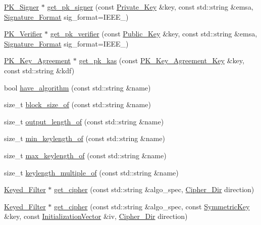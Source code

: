 \begin{DoxyCompactItemize}
\hyperlink{classBotan_1_1PK__Signer}{P\-K\-\_\-\-Signer} $\ast$ \hyperlink{namespaceBotan_adccb197b7d2ba3c31a1a99a83e7e2721}{get\-\_\-pk\-\_\-signer} (const \hyperlink{classBotan_1_1Private__Key}{Private\-\_\-\-Key} \&key, const std\-::string \&emsa, \hyperlink{namespaceBotan_ad8a9578625edf847cbcba3ae15648cda}{Signature\-\_\-\-Format} sig\-\_\-format=I\-E\-E\-E\-\_)
\item 
\hyperlink{classBotan_1_1PK__Verifier}{P\-K\-\_\-\-Verifier} $\ast$ \hyperlink{namespaceBotan_aede89bdb65b872bc1049fbb2a6210beb}{get\-\_\-pk\-\_\-verifier} (const \hyperlink{classBotan_1_1Public__Key}{Public\-\_\-\-Key} \&key, const std\-::string \&emsa, \hyperlink{namespaceBotan_ad8a9578625edf847cbcba3ae15648cda}{Signature\-\_\-\-Format} sig\-\_\-format=I\-E\-E\-E\-\_)
\item 
\hyperlink{classBotan_1_1PK__Key__Agreement}{P\-K\-\_\-\-Key\-\_\-\-Agreement} $\ast$ \hyperlink{namespaceBotan_a60bcb95e6019b99e5dce1fbbd316273a}{get\-\_\-pk\-\_\-kas} (const \hyperlink{classBotan_1_1PK__Key__Agreement__Key}{P\-K\-\_\-\-Key\-\_\-\-Agreement\-\_\-\-Key} \&key, const std\-::string \&kdf)
\item 
bool \hyperlink{namespaceBotan_abb4bf7a27385661c1b0e226fc86449dd}{have\-\_\-algorithm} (const std\-::string \&name)
\item 
size\-\_\-t \hyperlink{namespaceBotan_af96cd2e097b1de4291aa390c9ef919a3}{block\-\_\-size\-\_\-of} (const std\-::string \&name)
\item 
size\-\_\-t \hyperlink{namespaceBotan_ae9b9664938354dc2ea453b55b436b8eb}{output\-\_\-length\-\_\-of} (const std\-::string \&name)
\item 
size\-\_\-t \hyperlink{namespaceBotan_a6660ec0093503e543ed0059aaaaa156c}{min\-\_\-keylength\-\_\-of} (const std\-::string \&name)
\item 
size\-\_\-t \hyperlink{namespaceBotan_a653fc7b994880576b73df480242548c9}{max\-\_\-keylength\-\_\-of} (const std\-::string \&name)
\item 
size\-\_\-t \hyperlink{namespaceBotan_af38a8c4529bebf4586aa3613113d6b2b}{keylength\-\_\-multiple\-\_\-of} (const std\-::string \&name)
\item 
\hyperlink{classBotan_1_1Keyed__Filter}{Keyed\-\_\-\-Filter} $\ast$ \hyperlink{namespaceBotan_a86b64b4a297e6177ebdcca687ddece39}{get\-\_\-cipher} (const std\-::string \&algo\-\_\-spec, \hyperlink{namespaceBotan_ad9d14ffdc73fc19966421979b32ee759}{Cipher\-\_\-\-Dir} direction)
\item 
\hyperlink{classBotan_1_1Keyed__Filter}{Keyed\-\_\-\-Filter} $\ast$ \hyperlink{namespaceBotan_a981ba7233643228ace2696f2baa2f8d5}{get\-\_\-cipher} (const std\-::string \&algo\-\_\-spec, const \hyperlink{namespaceBotan_a00c78597211d5c63b63e2a57ddb96d38}{Symmetric\-Key} \&key, const \hyperlink{namespaceBotan_ab6a07e859c4e3a2ccfd68308ec89497e}{Initialization\-Vector} \&iv, \hyperlink{namespaceBotan_ad9d14ffdc73fc19966421979b32ee759}{Cipher\-\_\-\-Dir} direction)

\end{DoxyCompactItemize}
